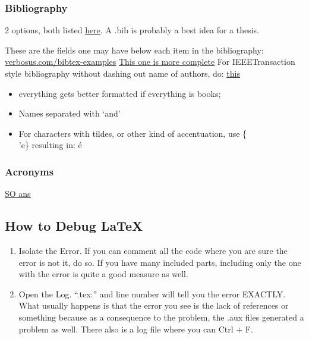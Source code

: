 \subsubsection{Bibliography}
2 options, both listed \href{https://www.overleaf.com/learn/latex/Bibliography_management_with_bibtex}{\ul{here}}.
A .bib is probably a best idea for a thesis.

These are the fields one may have below each item in the bibliography:
\href{https://verbosus.com/bibtex-style-examples.html}{\ul{verbosus.com/bibtex-examples}}
\href{https://en.wikibooks.org/wiki/LaTeX/Bibliography_Management#Authors}{\ul{This one is more complete}}
For IEEETransaction style bibliography without dashing out name of authors, do:
\href{https://engineering.purdue.edu/~mark/puthesis/faq/replace-dashes-with-authors-names/i.pdf}{\ul{this}}

\begin{itemize}
    \item everything gets better formatted if everything is books;
    \item Names separated with `and'
    \item For characters with tildes, or other kind of accentuation, use \{\\'e\} resulting in: {\'e}
\end{itemize}

\subsubsection{Acronyms}
\href{https://tex.stackexchange.com/questions/306918/how-to-add-acronym-list}{\ul{SO ans}}
\subsection{How to Debug LaTeX}
\begin{enumerate}
    \item Isolate the Error. If you can comment all the code where you are sure the error is not it, do so. If you have many included parts, including only the one with the error is quite a good measure as well.
    \item Open the Log. ``.tex:'' and line number will tell you the error EXACTLY. What usually happens is that the error you see is the lack of references or something because as a consequence to the problem, the .aux files generated a problem as well.  There also is a log file where you can Ctrl + F.
\end{enumerate}

